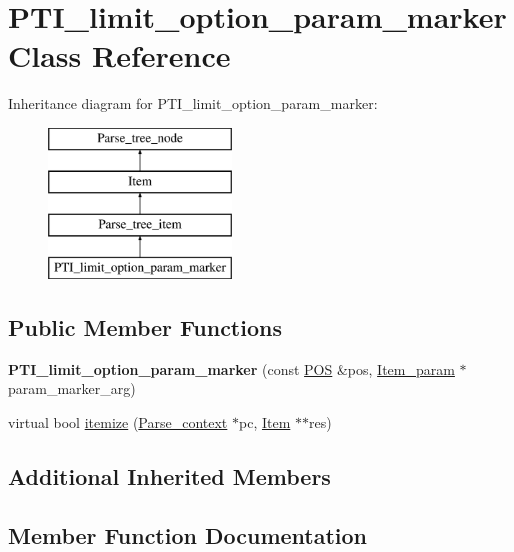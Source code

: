 \hypertarget{classPTI__limit__option__param__marker}{}\section{P\+T\+I\+\_\+limit\+\_\+option\+\_\+param\+\_\+marker Class Reference}
\label{classPTI__limit__option__param__marker}
Inheritance diagram for P\+T\+I\+\_\+limit\+\_\+option\+\_\+param\+\_\+marker\+:\begin{figure}[H]
\begin{center}
\leavevmode
\includegraphics[height=4.000000cm]{classPTI__limit__option__param__marker}
\end{center}
\end{figure}
\subsection*{Public Member Functions}
\begin{DoxyCompactItemize}
\item 
\mbox{\label{classPTI__limit__option__param__marker_a4cab8b49c07242687461a1b0914f54c5}} 
{\bfseries P\+T\+I\+\_\+limit\+\_\+option\+\_\+param\+\_\+marker} (const \mbox{\hyperlink{structYYLTYPE}{P\+OS}} \&pos, \mbox{\hyperlink{classItem__param}{Item\+\_\+param}} $\ast$param\+\_\+marker\+\_\+arg)
\item 
virtual bool \mbox{\hyperlink{classPTI__limit__option__param__marker_a814f82a8dc01094d2483959cd511c87d}{itemize}} (\mbox{\hyperlink{structParse__context}{Parse\+\_\+context}} $\ast$pc, \mbox{\hyperlink{classItem}{Item}} $\ast$$\ast$res)
\end{DoxyCompactItemize}
\subsection*{Additional Inherited Members}


\subsection{Member Function Documentation}
\mbox{\label{classPTI__limit__option__param__marker_a814f82a8dc01094d2483959cd511c87d}} 
